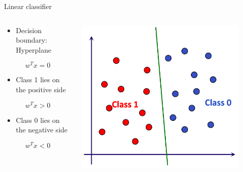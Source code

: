 \documentclass[aspectratio=169, 14pt]{beamer}
\begin{document}
\begin{frame}[t]{Linear classifier}
\begin{columns}
	\begin{column}{0.55\textwidth}
	\begin{itemize}
	  \item Decision boundary: Hyperplane
	\end{itemize}
	\[ w^{T} x=0 \]

	\begin{itemize}
	  \item Class 1 lies on the positive side
	\end{itemize}
	\[ w^{T} x>0 \]


	\begin{itemize}
	  \item Class 0 lies on the negative side
	\end{itemize}
        \[ w^{T} x<0 \]

	\end{column}
	\begin{column}{0.45\textwidth}
		\vskip-0.5cm
                \includegraphics[width=0.9\textwidth]{SVM_NonLinear_Images/AIML_SVM_IMG3.png}
	\end{column}
\end{columns}

\end{frame}
\end{document}
